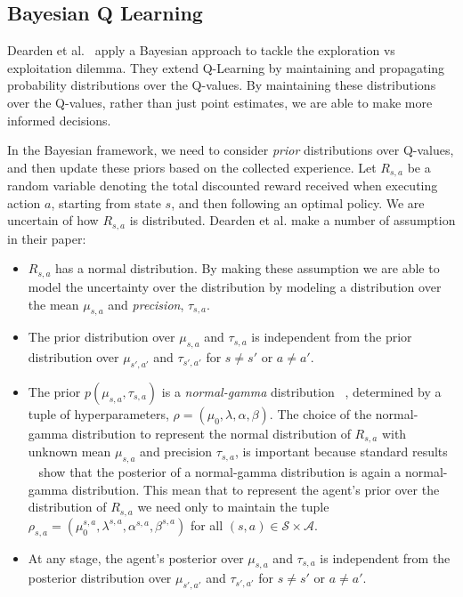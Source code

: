\subsection{Bayesian Q Learning}
Dearden et al.~\cite{Dearden98bayesianq-learning} apply a Bayesian approach to tackle the exploration vs exploitation dilemma. They extend Q-Learning by maintaining and propagating probability distributions over the Q-values. By maintaining these distributions over the Q-values, rather than just point estimates, we are able to make more informed decisions.\par
In the Bayesian framework, we need to consider \emph{prior} distributions over Q-values, and then update these priors based on the collected experience. Let $R_{s,a}$ be a random variable denoting the total discounted reward received when executing action $a$, starting from state $s$, and then following an optimal policy. We are uncertain of how $R_{s,a}$ is distributed. Dearden et al. make a number of assumption in their paper:
\begin{itemize}
	\item $R_{s,a}$ has a normal distribution. By making these assumption we are able to model the uncertainty over the distribution by modeling a distribution over the mean $\mu_{s,a}$ and \emph{precision}, $\tau_{s,a}$.
	\item The prior distribution over $\mu_{s,a}$ and $\tau_{s,a}$ is independent from the prior distribution over $\mu_{s',a'}$ and $\tau_{s',a'}$ for $s \neq s'$ or $a \neq a'$.
	\item The prior $p(\mu_{s,a},\tau_{s,a})$ is a \emph{normal-gamma} distribution ~\cite{degroot2012probability}, determined by a tuple of hyperparameters, $\rho=(\mu_0,\lambda,\alpha,\beta)$. The choice of the normal-gamma distribution to represent the normal distribution of $R_{s,a}$ with unknown mean $\mu_{s,a}$ and precision $\tau_{s,a}$, is important because standard results ~\cite{degroot2012probability} show that the posterior of a normal-gamma distribution is again a normal-gamma distribution. This mean that to represent the agent's prior over the distribution of $R_{s,a}$ we need only to maintain the tuple $\rho_{s,a}=(\mu_0^{s,a},\lambda^{s,a},\alpha^{s,a},\beta^{s,a})$ for all $(s,a) \in \mathcal{S \times A}$.
	\item At any stage, the agent's posterior over $\mu_{s,a}$ and $\tau_{s,a}$ is independent from the posterior distribution over $\mu_{s',a'}$ and $\tau_{s',a'}$ for $s \neq s'$ or $a \neq a'$.
\end{itemize} 
